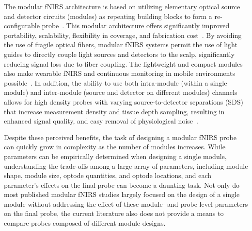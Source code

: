 The modular fNIRS architecture is based on utilizing elementary optical source and detector circuits (modules) as repeating building blocks to form a re-configurable probe~\cite{Zhao2017}. This modular architecture offers significantly improved portability, scalability, flexibility in coverage, and fabrication cost~\cite{Zhao2017}. By avoiding the use of fragile optical fibers, modular fNIRS systems permit the use of light guides to directly couple light sources and detectors to the scalp, significantly reducing signal loss due to fiber coupling. The lightweight and compact modules also make wearable fNIRS and continuous monitoring in mobile environments possible~\cite{Yucel2017, Park2018}. In addition, the ability to use both intra-module (within a single module) and inter-module (source and detector on different modules) channels allows for high density probes with varying source-to-detector separations (SDS) that increase measurement density and tissue depth sampling, resulting in enhanced signal quality, and easy removal of physiological noise~\cite{Gregg2010}. 

Despite these perceived benefits, the task of designing a modular fNIRS probe can quickly grow in complexity as the number of modules increases. While parameters can be empirically determined when designing a single module, understanding the trade-offs among a large array of parameters, including module shape, module size, optode quantities, and optode locations, and each parameter's effects on the final probe can become a daunting task. Not only do most published modular fNIRS studies largely focused on the design of a single module without addressing the effect of these module- and probe-level parameters on the final probe, the current literature also does not provide a means to compare probes composed of different module designs.

